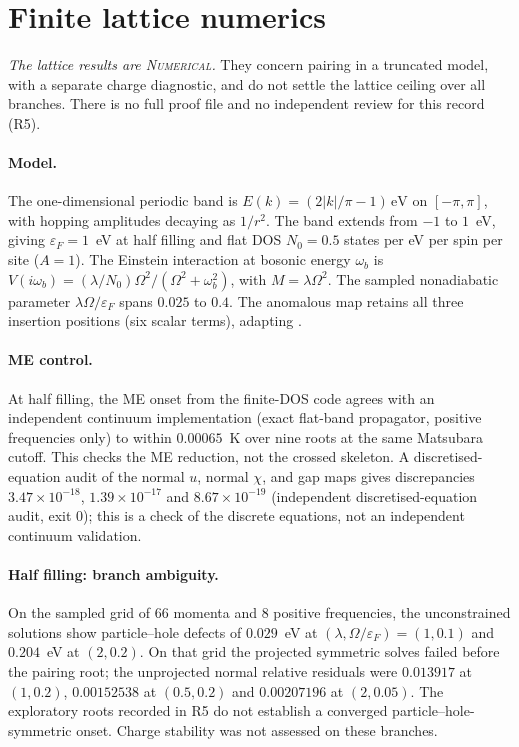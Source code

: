 \documentclass[11pt]{article}
\newcommand{\NUM}{\upshape\mdseries\textsc{Numerical}}
\theoremstyle{definition}
\theoremstyle{remark}
\begin{document}
\section{Finite lattice numerics}\label{sec:lattice}

\emph{The lattice results are \NUM.} They concern pairing in a truncated model, with a separate charge diagnostic, and do not settle the lattice ceiling over all branches.
There is no full proof file and no independent review for this record (R5).

\paragraph{Model.} The one-dimensional periodic band is $E(k)=(2|k|/\pi-1)\,\mathrm{eV}$ on $[-\pi,\pi]$, with hopping amplitudes decaying as $1/r^2$. The band extends from $-1$ to $1$~eV, giving $\varepsilon_F=1$~eV at half filling and flat DOS $N_0=0.5$ states per eV per spin per site ($A=1$). The Einstein interaction at bosonic energy $\omega_b$ is $V(i\omega_b)=(\lambda/N_0)\Omega^2/(\Omega^2+\omega_b^2)$, with $M=\lambda\Omega^2$. The sampled nonadiabatic parameter $\lambda\Omega/\varepsilon_F$ spans $0.025$ to $0.4$. The anomalous map retains all three insertion positions (six scalar terms), adapting \cite{Schrodi}.

\paragraph{ME control.} At half filling, the ME onset from the finite-DOS code agrees with an independent continuum implementation (exact flat-band propagator, positive frequencies only) to within $0.00065$~K over nine roots at the same Matsubara cutoff. This checks the ME reduction, not the crossed skeleton. A discretised-equation audit of the normal $u$, normal $\chi$, and gap maps gives discrepancies $3.47\times10^{-18}$, $1.39\times10^{-17}$ and $8.67\times10^{-19}$ (independent discretised-equation audit, exit 0); this is a check of the discrete equations, not an independent continuum validation.

\paragraph{Half filling: branch ambiguity.} On the sampled grid of 66 momenta and 8 positive frequencies, the unconstrained solutions show particle--hole defects of $0.029$~eV at $(\lambda,\Omega/\varepsilon_F)=(1,0.1)$ and $0.204$~eV at $(2,0.2)$. On that grid the projected symmetric solves failed before the pairing root; the unprojected normal relative residuals were $0.013917$ at $(1,0.2)$, $0.00152538$ at $(0.5,0.2)$ and $0.00207196$ at $(2,0.05)$. The exploratory roots recorded in R5 do not establish a converged particle--hole-symmetric onset. Charge stability was not assessed on these branches.
\end{document}
